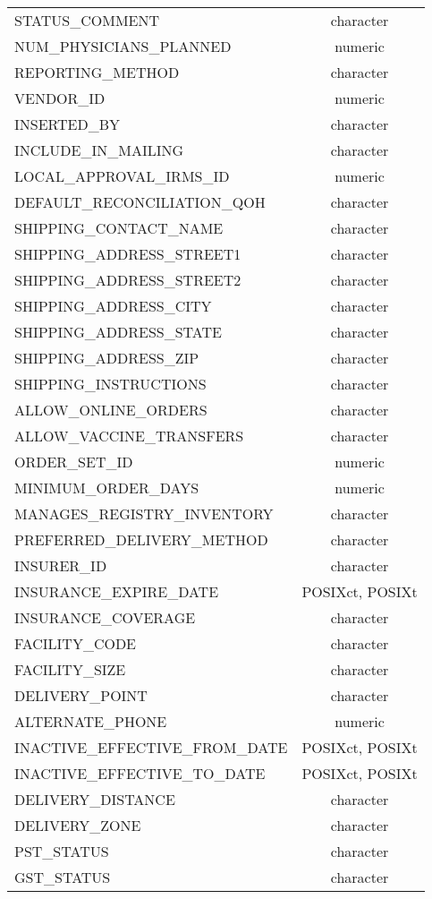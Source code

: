 \documentclass[
  letterpaper,
  DIV=11,
  numbers=noendperiod]{scrreprt}
\begin{document}
\begin{longtable}{lc}
STATUS\_COMMENT & character \\ 
NUM\_PHYSICIANS\_PLANNED & numeric \\ 
REPORTING\_METHOD & character \\ 
VENDOR\_ID & numeric \\ 
INSERTED\_BY & character \\ 
INCLUDE\_IN\_MAILING & character \\ 
LOCAL\_APPROVAL\_IRMS\_ID & numeric \\ 
DEFAULT\_RECONCILIATION\_QOH & character \\ 
SHIPPING\_CONTACT\_NAME & character \\ 
SHIPPING\_ADDRESS\_STREET1 & character \\ 
SHIPPING\_ADDRESS\_STREET2 & character \\ 
SHIPPING\_ADDRESS\_CITY & character \\ 
SHIPPING\_ADDRESS\_STATE & character \\ 
SHIPPING\_ADDRESS\_ZIP & character \\ 
SHIPPING\_INSTRUCTIONS & character \\ 
ALLOW\_ONLINE\_ORDERS & character \\ 
ALLOW\_VACCINE\_TRANSFERS & character \\ 
ORDER\_SET\_ID & numeric \\ 
MINIMUM\_ORDER\_DAYS & numeric \\ 
MANAGES\_REGISTRY\_INVENTORY & character \\ 
PREFERRED\_DELIVERY\_METHOD & character \\ 
INSURER\_ID & character \\ 
INSURANCE\_EXPIRE\_DATE & POSIXct, POSIXt \\ 
INSURANCE\_COVERAGE & character \\ 
FACILITY\_CODE & character \\ 
FACILITY\_SIZE & character \\ 
DELIVERY\_POINT & character \\ 
ALTERNATE\_PHONE & numeric \\ 
INACTIVE\_EFFECTIVE\_FROM\_DATE & POSIXct, POSIXt \\ 
INACTIVE\_EFFECTIVE\_TO\_DATE & POSIXct, POSIXt \\ 
DELIVERY\_DISTANCE & character \\ 
DELIVERY\_ZONE & character \\ 
PST\_STATUS & character \\ 
GST\_STATUS & character \\ 

\end{longtable}
\end{document}
